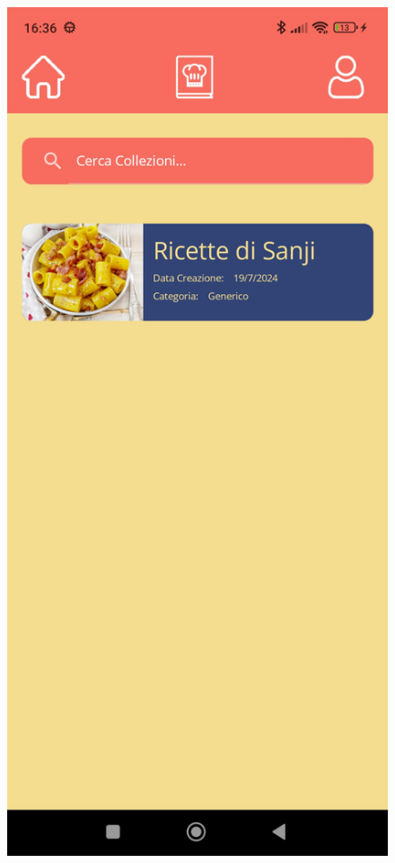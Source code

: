﻿\documentclass[a4paper,12pt]{report}
\begin{document}
\begin{figure}[h!]
\begin{minipage}{.5\textwidth}
    \end{minipage}
    \begin{minipage}{.5\textwidth}
        \centering
        \includegraphics[width=0.9\linewidth]{app_images/CollectionList.jpg}
    \end{minipage}
\end{figure}
\end{document}

